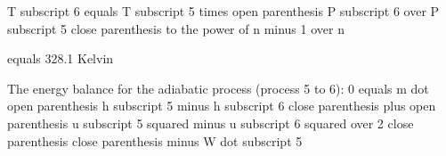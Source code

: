 T subscript 6 equals T subscript 5 times open parenthesis P subscript 6 over P subscript 5 close parenthesis to the power of n minus 1 over n

equals 328.1 Kelvin

The energy balance for the adiabatic process (process 5 to 6):
0 equals m dot open parenthesis h subscript 5 minus h subscript 6 close parenthesis plus open parenthesis u subscript 5 squared minus u subscript 6 squared over 2 close parenthesis close parenthesis minus W dot subscript 5